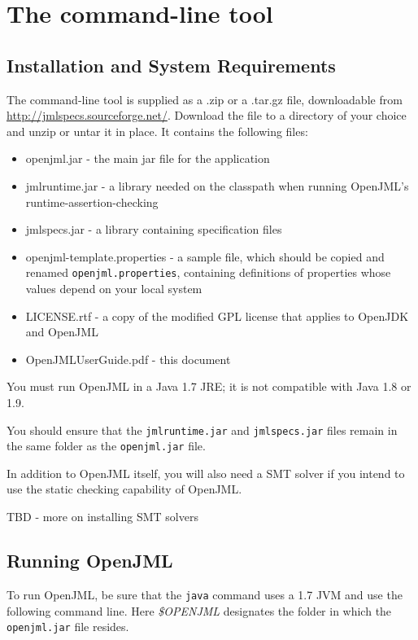 
\chapter{The command-line tool}
\label{CommandLineTool}
\section{Installation and System Requirements}

The command-line tool is supplied as a .zip or a .tar.gz file, downloadable from \url{http://jmlspecs.sourceforge.net/}.
Download the file to a directory of your choice and unzip or untar it in place.
It contains the following files:
\begin{itemize}\nospace
\item openjml.jar - the main jar file for the application
\item jmlruntime.jar - a library needed on the classpath when running OpenJML's runtime-assertion-checking
\item jmlspecs.jar - a library containing specification files
\item openjml-template.properties - a sample file, which should be copied and renamed {\tt openjml.properties}, containing definitions of properties whose values depend on your local system
\item LICENSE.rtf - a copy of the modified GPL license that applies to OpenJDK and OpenJML
\item OpenJMLUserGuide.pdf - this document
\end{itemize}

You must run OpenJML in a Java 1.7 JRE; it is not compatible with Java 1.8 or 1.9.

You should ensure that the {\tt jmlruntime.jar} and {\tt jmlspecs.jar} files remain in the same folder as the {\tt openjml.jar} file.

In addition to OpenJML itself, you will also need a SMT solver if you intend to use the static checking capability of OpenJML.

TBD - more on installing SMT solvers

\section{Running OpenJML}
\label{Running}

To run OpenJML, be sure that the \texttt{java} command uses a 1.7 JVM and use the following command line. Here \textit{\$OPENJML} designates the folder in which the {\tt openjml.jar} file resides.

